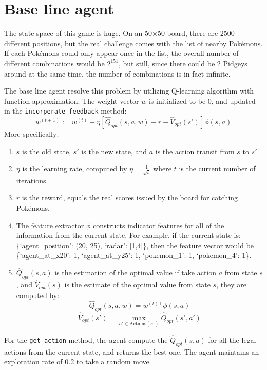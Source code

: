 \documentclass[12pt]{article}
\begin{document}
\section*{Base line agent}
\par
The state space of this game is huge. On an 50$\times$50 board, there are 
2500 different positions, but the real challenge comes with the list of nearby 
Pok\'emons. If each Pok\'emons could only appear once in the list, the overall
number of different combinations would be $2^{151}$, but still, since
there could be 2 Pidgeys around at the same time, the number of 
combinations is in fact infinite.
\par
The base line agent resolve this problem by utilizing 
Q-learning algorithm with function approximation.
The weight vector $w$ is initialized to be 0, and updated
in the \texttt{incorperate\_feedback} method:
\[
w^{(t+1)} := w^{(t)} - \eta[\hat{Q}_{opt}(s, a, w) - r - \hat{V}_{opt}(s')] \phi(s,a)
\]
More specifically:
\begin{enumerate}[label=(\alph*)]
\item
$s$ is the old state, $s'$ is the new state, 
and $a$ is the action transit from $s$ to $s'$
\item$\eta$ is the learning rate, computed by $\eta = \frac{1}{\sqrt{t}}$
		where $t$ is the current number of iterations
\item $r$ is the reward, equals the real scores issued by the board for
 catching Pok\'emons.
\item The feature 
extractor $\phi$ constructs indicator features for
all of the information from the current state. For
example, if the current state is: 
  \{`agent\_position': (20, 25), `radar': [1,4]\},
then the feature vector would be 
  \{`agent\_at\_x20': 1, `agent\_at\_y25': 1, `pokemon\_1': 1, `pokemon\_4': 1\}.

\item $\hat{Q}_{opt}(s,a)$ is the estimation of the optimal value if take
action $a$ from state $s$, and $\hat{V}_{opt}(s)$ is the estimate of the optimal
value from state $s$, they are computed by:
\[\hat{Q}_{opt}(s, a, w) = w^{(t)\top}\phi(s, a)\]
\[\hat{V}_{opt}(s') = \max_{a' \in \text{Actions}(s')}{\hat{Q}_{opt}(s', a')}\]
\end{enumerate}
For the \texttt{get\_action} method, the agent compute the $\hat{Q}_{opt}(s,a)$
for all the legal actions from the current state, and returns the best one.
The agent maintains an exploration rate of 0.2 to take a random move.
\end{document}
